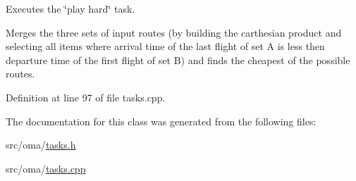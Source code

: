 Executes the \char`\"{}play hard\char`\"{} task. 

Merges the three sets of input routes (by building the carthesian product and selecting all items where arrival time of the last flight of set A is less then departure time of the first flight of set B) and finds the cheapest of the possible routes. 

Definition at line 97 of file tasks.\-cpp.



The documentation for this class was generated from the following files\-:\begin{DoxyCompactItemize}
\item 
src/oma/\hyperlink{tasks_8h}{tasks.\-h}\item 
src/oma/\hyperlink{tasks_8cpp}{tasks.\-cpp}\end{DoxyCompactItemize}
